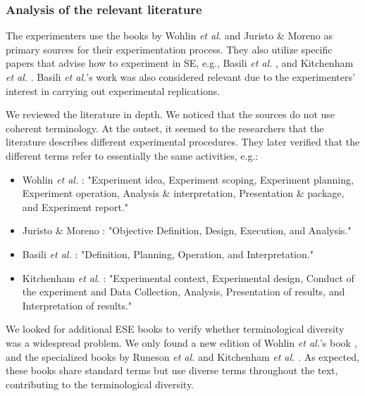\subsubsection{Analysis of the relevant literature}
The experimenters use the books by Wohlin \textit{et al.} \cite{Wohlin-2000-Experimentation-SE} and Juristo \& Moreno \cite{Juristo-2001-SE-experimentation} as primary sources for their experimentation process. They also utilize specific papers that advise how to experiment in SE, e.g., Basili \textit{et al.} \cite{Basili-1986-ESE}, and Kitchenham \textit{et al.} \cite{Kitchenham-2002-empirical-research-guidelines-SE}. Basili \textit{et al.}'s work \cite{Basili-1999-families-experiments} was also considered relevant due to the experimenters' interest in carrying out experimental replications.

We reviewed the literature in depth. We noticed that the sources do not use coherent terminology. At the outset, it seemed to the researchers that the literature describes different experimental procedures. They later verified that the different terms refer to essentially the same activities, e.g.:

\begin{itemize}
	\item Wohlin \textit{et al.} \cite{Wohlin-2000-Experimentation-SE}: "Experiment idea, Experiment scoping, Experiment planning, Experiment operation, Analysis \& interpretation, Presentation \& package, and Experiment report."
	\item Juristo \& Moreno \cite{Juristo-2001-SE-experimentation}: "Objective Definition, Design, Execution, and Analysis."
	\item Basili \textit{et al.} \cite{Basili-1986-ESE}: "Definition, Planning, Operation, and Interpretation."
	\item Kitchenham \textit{et al.} \cite{Kitchenham-2002-empirical-research-guidelines-SE}: "Experimental context, Experimental design, Conduct of the experiment and Data Collection, Analysis, Presentation of results, and Interpretation of results."
\end{itemize}

We looked for additional ESE books to verify whether terminological diversity was a widespread problem. We only found a new edition of Wohlin \textit{et al.}'s book \cite {Wohlin-2012-experimentatio-SE}, and the specialized books by Runeson \textit{et al.} \cite{Runenson-2012-case-study-SE} and Kitchenham \textit{et al.} \cite{Kitchenham-2015-Evidence-Based-SE}. As expected, these books share standard terms but use diverse terms throughout the text, contributing to the terminological diversity.

